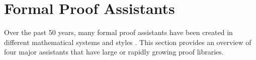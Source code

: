 \documentclass[bsc,frontabs,oneside,singlespacing,parskip,deptreport,logo]{infthesis}
\begin{document}

\section{Formal Proof Assistants}

Over the past 50 years, many formal proof assistants have been created in different mathematical systems and styles \cite{geuvers_proof_2009}. This section provides an overview of four major assistants that have large or rapidly growing proof libraries. %


\end{document}
